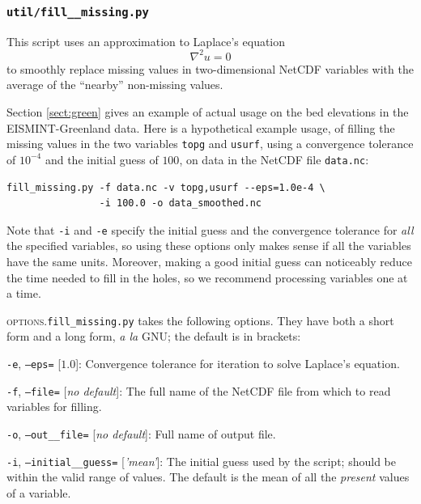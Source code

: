 \documentclass[11pt,final]{amsart}
\newcommand{\grad}{\nabla}
\newcommand{\und}{\_\!\_}
\begin{document}
\newcommand{\scriptoptdef}[3]{\vspace{1mm}\noindent \large\texttt{-#1},\,\,\texttt{--#2=}\normalsize\,\,[\textsl{#3}]:\quad}

\newcommand{\scripthead}[1]{\subsubsection*{\Large{\texttt{#1}}}}

\newcommand{\opthead}{\smallskip \noindent\textsc{options}.\quad}

\scripthead{util/fill\und missing.py}\index{fill\und missing.py}  This script uses an approximation to Laplace's equation
	$$\grad^2 u = 0$$
to smoothly replace missing values in two-dimensional NetCDF variables with the average of the ``nearby'' non-missing values.

Section \ref{sect:green} gives an example of actual usage on the bed elevations in the EISMINT-Greenland data.  Here is a hypothetical example usage, of filling the missing values in the two variables \verb|topg| and \verb|usurf|, using a convergence tolerance of $10^{-4}$ and the initial guess of $100$, on data in the NetCDF file \verb|data.nc|:

\begin{verbatim}
fill_missing.py -f data.nc -v topg,usurf --eps=1.0e-4 \
                -i 100.0 -o data_smoothed.nc
\end{verbatim}
Note that \verb|-i| and \verb|-e| specify the initial guess and the convergence tolerance for \emph{all} the specified variables, so using these options only makes sense if all the variables have the same units. Moreover, making a good initial guess can noticeably reduce the time needed to fill in the holes, so we recommend processing variables one at a time.

\opthead  \verb|fill_missing.py| takes the following options.  They have both a short form and a long form, \emph{a la} GNU; the default is in brackets:

\scriptoptdef{e}{eps}{$1.0$}  Convergence tolerance for iteration to solve Laplace's equation.

\scriptoptdef{f}{file}{no default}  The full name of the NetCDF file from which to read variables for filling.

\scriptoptdef{o}{out\und file}{no default}  Full name of output file.

\scriptoptdef{i}{initial\und guess}{'mean'}  The initial guess used by the script; should be within the valid range of values. The default is the mean of all the \emph{present} values of a variable.
\end{document}
